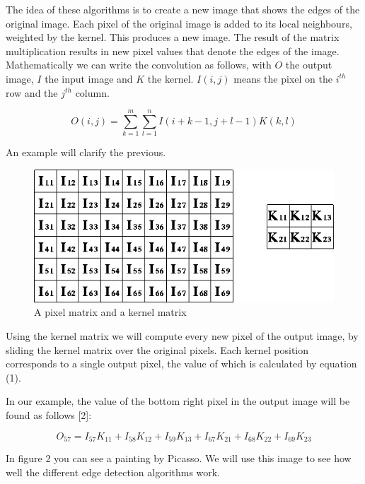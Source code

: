 \documentclass[12pt]{article}
\begin{document}
The idea of these algorithms is to create a new image that shows the edges of the original image. Each pixel of the original image is added to its local neighbours, weighted by the kernel. This produces a new image. The result of the matrix multiplication results in new pixel values that denote the edges of the image. 
Mathematically we can write the convolution as follows, with $O$ the output image, $I$ the input image and $K$ the kernel. $I(i,j)$ means the pixel on the $i^{th}$ row and the $j^{th}$ column.

\begin{equation}
O(i, j) =  \sum\limits_{k=1}^m\sum\limits_{l=1}^n I(i + k - 1, j + l - 1)K(k,l)
\end{equation}
\newline

An example will clarify the previous.

\begin{figure}[h]
\centering
\includegraphics[scale = 0.5]{img/convolution}
\caption{A pixel matrix and a kernel matrix}
\end{figure}

Using the kernel matrix we will compute every new pixel of the output image, by sliding the kernel matrix over the original pixels. Each kernel position corresponds to a single output pixel, the value of which is calculated by equation (1).
\newline

In our example, the value of the bottom right pixel in the output image will be found as follows [2]:

\begin{equation}
O_{57} = I_{57}K_{11} + I_{58}K_{12} + I_{59}K_{13} + I_{67}K_{21} + I_{68}K_{22} + I_{69}K_{23}
\end{equation}
\newpage

In figure 2 you can see a painting by Picasso. We will use this image to see how well the different edge detection algorithms work.
\end{document}
